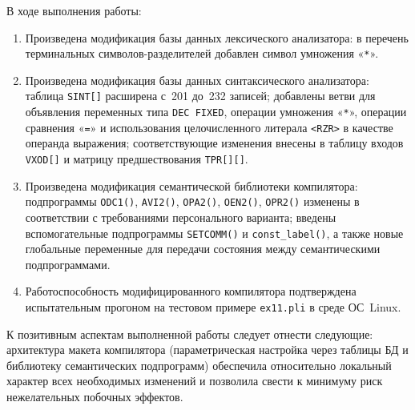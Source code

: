 \documentclass[a4paper,14pt]{extarticle}
\begin{document}
В ходе выполнения работы:

\begin{enumerate}
  \item Произведена модификация базы данных лексического анализатора: в перечень
        терминальных символов-разделителей добавлен символ умножения «\texttt{*}».

  \item Произведена модификация базы данных синтаксического анализатора:
        таблица \texttt{SINT[]} расширена с~201 до~232 записей; добавлены
        ветви для объявления переменных типа \texttt{DEC FIXED}, операции
        умножения «\texttt{*}», операции сравнения «\texttt{=}» и использования
        целочисленного литерала \texttt{<RZR>} в качестве операнда выражения;
        соответствующие изменения внесены в таблицу входов \texttt{VXOD[]} и
        матрицу предшествования \texttt{TPR[][]}.

  \item Произведена модификация семантической библиотеки компилятора:
        подпрограммы \texttt{ODC1()}, \texttt{AVI2()}, \texttt{OPA2()},
        \texttt{OEN2()}, \texttt{OPR2()} изменены в соответствии с требованиями
        персонального варианта; введены вспомогательные подпрограммы
        \texttt{SETCOMM()} и \texttt{const\_label()}, а также новые глобальные
        переменные для передачи состояния между семантическими подпрограммами.

  \item Работоспособность модифицированного компилятора подтверждена
        испытательным прогоном на тестовом примере \texttt{ex11.pli} в среде
        ОС~Linux.
\end{enumerate}

К позитивным аспектам выполненной работы следует отнести следующие:
архитектура макета компилятора (параметрическая настройка через таблицы БД и
библиотеку семантических подпрограмм) обеспечила относительно локальный характер
всех необходимых изменений и позволила свести к минимуму риск нежелательных
побочных эффектов.
\end{document}
